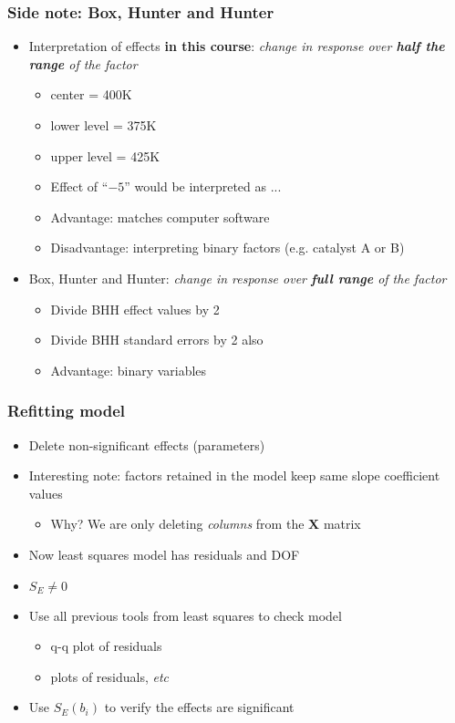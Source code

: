 \begin{frame}\frametitle{Side note: Box, Hunter and Hunter}
	\begin{itemize}
		\item	Interpretation of effects \textbf{in this course}: \emph{change in response over \textbf{half the range} of the factor}
		\begin{itemize}
			\item	center = 400K
			\item	lower level = 375K
			\item	upper level = 425K
			\item	Effect of ``$-5$'' would be interpreted as ...
			\item	Advantage: matches computer software
			\item	Disadvantage: interpreting binary factors (e.g. catalyst A or B)
		\end{itemize}
	\end{itemize}
	\begin{itemize}
		\item	Box, Hunter and Hunter: \emph{change in response over \textbf{full range} of the factor}
		\begin{itemize}
			\item	Divide BHH effect values by 2
			\item	Divide BHH standard errors by 2 also
			\item	Advantage: binary variables
		\end{itemize}
	\end{itemize}
\end{frame}

\begin{frame}\frametitle{Refitting model}
	\begin{itemize}
		\item	Delete non-significant effects (parameters)
		\item	Interesting note: factors retained in the model keep same slope coefficient values
		\begin{itemize}
			\item	Why? We are only deleting \emph{columns} from the $\mathbf{X}$ matrix
		\end{itemize}
		\item	Now least squares model has residuals and DOF
		\item	$S_E \neq 0$
		\item	Use all previous tools from least squares to check model
		\begin{itemize}
			\item	q-q plot of residuals
			\item	plots of residuals, \emph{etc}
		\end{itemize}
		\item	Use $S_E(b_i)$ to verify the effects are significant
	\end{itemize}
\end{frame}

